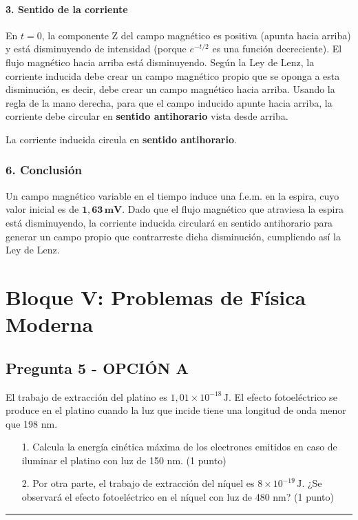 \paragraph*{3. Sentido de la corriente}
En $t=0$, la componente Z del campo magnético es positiva (apunta hacia arriba) y está disminuyendo de intensidad (porque $e^{-t/2}$ es una función decreciente). El flujo magnético hacia arriba está disminuyendo.
Según la Ley de Lenz, la corriente inducida debe crear un campo magnético propio que se oponga a esta disminución, es decir, debe crear un campo magnético hacia arriba.
Usando la regla de la mano derecha, para que el campo inducido apunte hacia arriba, la corriente debe circular en \textbf{sentido antihorario} vista desde arriba.
\begin{cajaresultado}
    La corriente inducida circula en \textbf{sentido antihorario}.
\end{cajaresultado}

\subsubsection*{6. Conclusión}
\begin{cajaconclusion}
Un campo magnético variable en el tiempo induce una f.e.m. en la espira, cuyo valor inicial es de $\mathbf{1,63 \, mV}$. Dado que el flujo magnético que atraviesa la espira está disminuyendo, la corriente inducida circulará en sentido antihorario para generar un campo propio que contrarreste dicha disminución, cumpliendo así la Ley de Lenz.
\end{cajaconclusion}

\newpage

\section{Bloque V: Problemas de Física Moderna}
\label{sec:moderna_2003_jun_ord}

\subsection{Pregunta 5 - OPCIÓN A}
\label{subsec:5A_2003_jun_ord}

\begin{cajaenunciado}
El trabajo de extracción del platino es $1,01\times10^{-18}\,\text{J}$. El efecto fotoeléctrico se produce en el platino cuando la luz que incide tiene una longitud de onda menor que 198 nm.
\begin{enumerate}
    \item[1.] Calcula la energía cinética máxima de los electrones emitidos en caso de iluminar el platino con luz de 150 nm. (1 punto)
    \item[2.] Por otra parte, el trabajo de extracción del níquel es $8\times10^{-19}\,\text{J}$. ¿Se observará el efecto fotoeléctrico en el níquel con luz de 480 nm? (1 punto)
\end{enumerate}
\end{cajaenunciado}
\hrule

